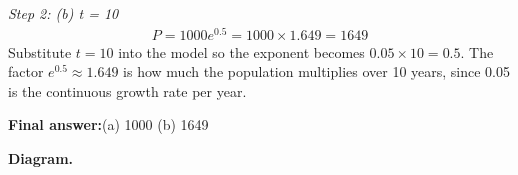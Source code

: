 \documentclass[11pt]{article}
\begin{document}
\textit{Step 2: (b) t = 10}
\[\begin{gathered}
P = 1000e^{0.5} = 1000 \times 1.649 = 1649
\end{gathered}\]
Substitute \( t = 10 \) into the model so the exponent becomes \( 0.05 \times 10 = 0.5 \). The factor \( e^{0.5} \approx 1.649 \) is how much the population multiplies over 10 years, since 0.05 is the continuous growth rate per year.

\begin{answerbox}
\textbf{Final answer:}\quad (a) 1000 (b) 1649
\end{answerbox}
\textbf{Diagram.}

\begin{center}
\end{center}
\end{document}
